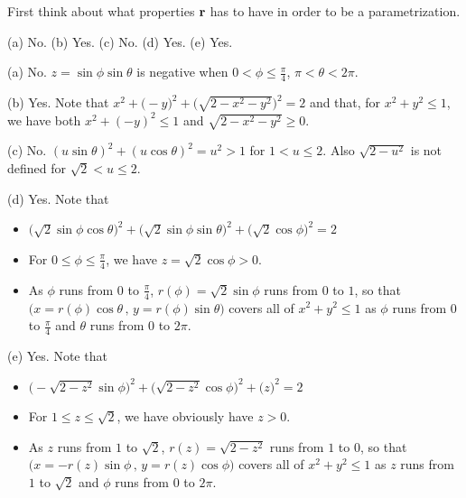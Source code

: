 \begin{hint} 
First think about what properties $\mathbf{r}$ has to have in order to be
a parametrization.
\end{hint}

\begin{answer} 
(a) No.\qquad
(b) Yes.\qquad
(c) No.\qquad
(d) Yes.\qquad
(e) Yes.
\end{answer}

\begin{solution} 
(a) No. $z=\sin\phi\sin \theta$ is negative when 
$0 <\phi\le\frac{\pi}{4}$, $\pi < \theta <2\pi$.

(b) Yes. Note that $x^2+\big(-y\big)^2+\big(\sqrt{2-x^2-y^2}\big)^2=2$
and that, for $x^2+y^2\le 1$, we have both $x^2+(-y)^2\le 1$ and
$\sqrt{2-x^2-y^2}\ge 0$.

(c) No. $(u\sin\theta)^2+(u\cos\theta)^2=u^2>1$ for $1<u\le 2$.
Also $\sqrt{2-u^2}$ is not defined for $\sqrt{2}<u\le 2$.

(d) Yes. Note that
\begin{itemize}\itemsep1pt \parskip0pt  %
\item[$\circ$]
$\big(\sqrt{2}\sin \phi\cos\theta\big)^2
 +\big(\sqrt{2}\sin \phi\sin\theta\big)^2
 +\big(\sqrt{2}\cos \phi\big)^2=2$
\item[$\circ$]
For $0\le\phi\le\frac{\pi}{4}$, we have $z=\sqrt{2}\cos \phi>0$.

\item[$\circ$]
As $\phi$ runs from $0$ to $\frac{\pi}{4}$, $r(\phi)=\sqrt{2}\sin\phi$
runs from $0$ to $1$, so that 
        $\big(x=r(\phi)\cos\theta\,,\,y=r(\phi)\sin\theta\big)$
covers all of $x^2+y^2\le1$ as $\phi$ runs from $0$ to $\frac{\pi}{4}$
and $\theta$ runs from $0$ to $2\pi$.

\end{itemize}

(e)
Yes. Note that
\begin{itemize}\itemsep1pt \parskip0pt  %
\item[$\circ$]
$\big(-\sqrt{2-z^2}\sin \phi\big)^2
 +\big(\sqrt{2-z^2}\cos \phi\big)^2
 +\big(z\big)^2=2$
\item[$\circ$]
For $1\le z\le\sqrt{2}$, we have obviously have $z>0$.

\item[$\circ$]
As $z$ runs from $1$ to $\sqrt{2}$, $r(z)=\sqrt{2-z^2}$
runs from $1$ to $0$, so that $\big(x=-r(z)\sin\phi\,,\,y=r(z)\cos\phi\big)$
covers all of $x^2+y^2\le1$ as $z$ runs from $1$ to $\sqrt{2}$
and $\phi$ runs from $0$ to $2\pi$.

\end{itemize}
\end{solution}

